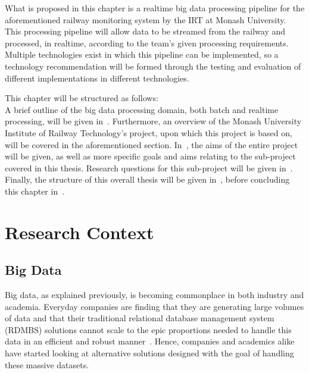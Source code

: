 What is proposed in this chapter is a realtime big data processing pipeline for the aforementioned railway monitoring
system by the IRT at Monash University. This processing pipeline will allow data to be
streamed from the railway and processed, in realtime, according to the team's given processing requirements. Multiple
technologies exist in which this pipeline can be implemented, so a technology recommendation will be formed through
the testing and evaluation of different implementations in different technologies.

This chapter will be structured as follows:\\
A brief outline of the big data processing domain, both batch and realtime processing, will be given
in~. Furthermore, an overview of the Monash University Institute of Railway Technology's
project, upon which this project is based on, will be covered in the aforementioned section. In~,
the aims of the entire project will be given, as well as more specific goals and aims relating to the sub-project
covered in this thesis. Research questions for this sub-project will be given in~.
Finally, the structure of this overall thesis will be given in~, before
concluding this chapter in~.




\section{Research Context} %
\label{sec:research_context}

\subsection{Big Data} %
\label{sub:big_data}

Big data, as explained previously, is becoming commonplace in both industry and academia. Everyday companies are finding
that they are generating large volumes of data and that their traditional relational database management system (RDMBS) solutions cannot
scale to the epic proportions needed to handle this data in an efficient and robust manner~\cite{marz2013principles}.
Hence, companies and academics alike have started looking at alternative solutions designed with the goal of handling
these massive datasets.

